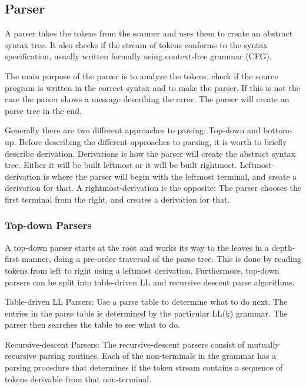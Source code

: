 \subsection{Parser}
A parser takes the tokens from the scanner and uses them to create an abstract syntax tree. It also checks if the stream of tokens conforms to the syntax specification, usually written formally using context-free grammar (CFG).

The main purpose of the parser is to analyze the tokens, check if the source program is written in the correct syntax and to make the parser. If this is not the case the parser shows a message describing the error. The parser will create an parse tree in the end. 

Generally there are two different approaches to parsing: Top-down and bottom-up. Before describing the different approaches to parsing, it is worth to briefly describe derivation. Derivations is how the parser will create the abstract syntax tree.
Either it will be built leftmost or it will be built rightmost. Leftmost-derivation is where the parser will begin with the leftmost terminal, and create a derivation for that. A rightmost-derivation is the opposite: The parser chooses the first terminal from the right, and creates a derivation for that.

\subsubsection{Top-down Parsers}
A top-down parser starts at the root and works its way to the leaves in a depth-first manner, doing a pre-order traversal of the parse tree. This is done by reading tokens from left to right using a leftmost derivation. Furthermore, top-down parsers can be split into table-driven LL and recursive descent parse algorithms.

\begin{inddes}
	\item[Table-driven LL Parsers:] Use a parse table to determine what to do next. The entries in the parse table is determined by the particular LL(k) grammar. The parser then searches the table to see what to do.
	\item[Recursive-descent Parsers:] The recursive-descent parsers consist of mutually recursive parsing routines. Each of the non-terminals in the grammar has a parsing procedure that determines if the token stream contains a sequence of tokens derivable from that non-terminal.
\end{inddes}


